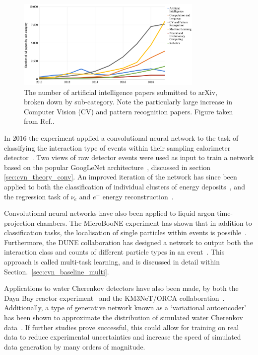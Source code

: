 \begin{figure} %
    \includegraphics[width=0.8\textwidth]{diagrams/6-cvn/papers.png}
    \caption[papers short]
    {The number of artificial intelligence papers submitted to arXiv, broken down by sub-category.
        Note the particularly large increase in Computer Vision (CV) and pattern recognition
        papers. Figure taken from Ref.\cite{perrault2019}.}
    \label{fig:papers}
\end{figure}

In 2016 the \nova experiment applied a convolutional neural network to the task of classifying the
interaction type of events within their sampling calorimeter detector~\cite{aurisano2016}. Two
views of raw detector events were used as input to train a network based on the popular GoogLeNet
architecture~\cite{szegedy2015}, discussed in section \ref{sec:cvn_theory_conv}. An
improved iteration of the network has since been applied to both the classification of individual
clusters of energy deposits~\cite{psihas2019}, and the regression task of $\nu_{e}$ and $e^{-}$
energy reconstruction~\cite{baldi2019}.

Convolutional neural networks have also been applied to liquid argon time-projection chambers. The
MicroBooNE experiment has shown that in addition to classification tasks, the localisation of
single particles within events is possible~\cite{acciarri2017}. Furthermore, the DUNE
collaboration has designed a network to output both the interaction class and counts of different
particle types in an event~\cite{collaboration2020, abi2020}. This approach is called multi-task
learning, and is discussed in detail within Section.~\ref{sec:cvn_baseline_multi}.

Applications to water Cherenkov detectors have also been made, by both the Daya Bay reactor
experiment~\cite{racah2016} and the KM3NeT/ORCA collaboration~\cite{aiello2020}. Additionally, a
type of generative network known as a `variational autoencoder' has been shown to approximate the
distribution of simulated water Cherenkov data~\cite{abhishek2019}. If further studies prove
successful, this could allow for training on real data to reduce experimental uncertainties and
increase the speed of simulated data generation by many orders of magnitude.

